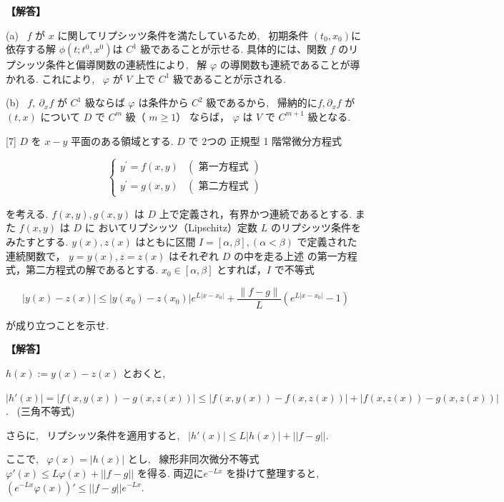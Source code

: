 \documentclass{jsarticle}
\begin{document}
\noindent
\textbf{【解答】}

(a) \ $f$ が $x$ に関してリプシッツ条件を満たしているため, \ 初期条件 $(t_0, x_0)$に依存する解 $\phi\left(t ; t^{0}, x^{0}\right)$は $C^1$ 級であることが示せる. 具体的には、関数 $f$ のリプシッツ条件と偏導関数の連続性により, \ 解 $\varphi$ の導関数も連続であることが導かれる. これにより, \ $\varphi$ が $V$ 上で $C^1$ 級であることが示される.

(b) \ $f, \ \partial_x f$ が $C^1$ 級ならば $\varphi$ は条件から $C^2$ 級であるから, \ 帰納的に$f, \partial_{x} f$ が $(t, x)$ について $D$ で 
$C^{m}$ 級（ $ m \geq 1）$ ならば， $\varphi$ は $V$ で $C^{m+1}$ 級となる.
 


\begin{itembox}[l]{[7]}
$D$ を $x-y$ 平面のある領域とする. $D$ で $2 つ の$ 正規型 1 階常微分方程式

\[
\begin{cases}y^{\prime}=f(x, y) & (\text { 第一方程式 })  \tag{18}\\ y^{\prime}=g(x, y) & (\text { 第二方程式 })\end{cases}
\]

を考える. $f(x, y), g(x, y)$ は $D$ 上で定義され，有界かつ連続であるとする. また $f(x, y)$ は $D$ に おいてリプシッツ（Lipschitz）定数 $L$ のリプシッツ条件をみたすとする. $y(x), z(x)$ はともに区間 $I=[\alpha, \beta],(\alpha<\beta)$ で定義された連続関数で， $y=y(x), z=z(x)$ はそれぞれ $D$ の中を走る上述 の第一方程式，第二方程式の解であるとする. $x_{0} \in[\alpha, \beta]$ とすれば，$I$ で不等式


\begin{equation*}
|y(x)-z(x)| \leqslant\left|y\left(x_{0}\right)-z\left(x_{0}\right)\right| e^{L\left|x-x_{0}\right|}+\frac{\|f-g\|}{L}\left(e^{L\left|x-x_{0}\right|}-1\right) \tag{19}
\end{equation*}


が成り立つことを示せ.  
\end{itembox}

\noindent
\textbf{【解答】}

$h(x) := y(x) - z(x)$ とおくと, 

$|h'(x)| = |f(x, y(x)) - g(x, z(x))| 
\le |f(x, y(x)) - f(x, z(x))| + |f(x, z(x)) - g(x, z(x))|$. \ (三角不等式)

さらに, \ リプシッツ条件を適用すると, \ $|h'(x)| \le L|h(x)| + ||f - g||$.

ここで, \ $\varphi(x) = |h(x)|$ とし, \ 線形非同次微分不等式$\varphi'(x) \le L\varphi(x) + ||f - g||$ を得る.
両辺に$e^{-Lx}$ を掛けて整理すると, \ 
$(e^{-Lx} \varphi(x))' \le ||f - g||e^{-Lx}$.
\end{document}
